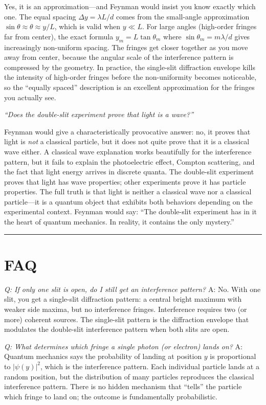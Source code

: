 Yes, it is an approximation---and Feynman would insist you know exactly which one. The equal spacing $\Delta y = \lambda L/d$ comes from the small-angle approximation $\sin\theta \approx \theta \approx y/L$, which is valid when $y \ll L$. For large angles (high-order fringes far from center), the exact formula $y_m = L\tan\theta_m$ where $\sin\theta_m = m\lambda/d$ gives increasingly non-uniform spacing. The fringes get closer together as you move away from center, because the angular scale of the interference pattern is compressed by the geometry. In practice, the single-slit diffraction envelope kills the intensity of high-order fringes before the non-uniformity becomes noticeable, so the ``equally spaced'' description is an excellent approximation for the fringes you actually see.

\textit{``Does the double-slit experiment prove that light is a wave?''}

Feynman would give a characteristically provocative answer: no, it proves that light is \emph{not} a classical particle, but it does not quite prove that it is a classical wave either. A classical wave explanation works beautifully for the interference pattern, but it fails to explain the photoelectric effect, Compton scattering, and the fact that light energy arrives in discrete quanta. The double-slit experiment proves that light has wave properties; other experiments prove it has particle properties. The full truth is that light is neither a classical wave nor a classical particle---it is a quantum object that exhibits both behaviors depending on the experimental context. Feynman would say: ``The double-slit experiment has in it the heart of quantum mechanics. In reality, it contains the only mystery.''

\bigskip
\hrule
\bigskip
\section*{FAQ}

\textit{Q: If only one slit is open, do I still get an interference pattern?}
A: No. With one slit, you get a single-slit diffraction pattern: a central bright maximum with weaker side maxima, but no interference fringes. Interference requires two (or more) coherent sources. The single-slit pattern is the diffraction envelope that modulates the double-slit interference pattern when both slits are open.

\textit{Q: What determines which fringe a single photon (or electron) lands on?}
A: Quantum mechanics says the probability of landing at position $y$ is proportional to $|\psi(y)|^2$, which is the interference pattern. Each individual particle lands at a random position, but the distribution of many particles reproduces the classical interference pattern. There is no hidden mechanism that ``tells'' the particle which fringe to land on; the outcome is fundamentally probabilistic.

